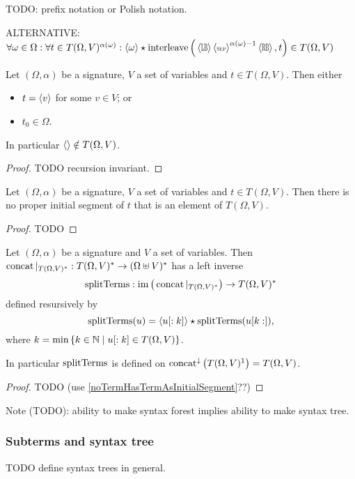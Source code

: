 TODO: prefix notation or Polish notation.

ALTERNATIVE: $\forall \omega\in\Omega: \forall t\in T(\Omega, V)^{\alpha(\omega)}: \seq{\omega}\concat \strInterleave\Big(\seq{\LB}\seq{\SEP}^{\alpha(\omega)-1}\seq{\RB}, t\Big) \in T(\Omega, V)$

\begin{lemma} \label{initialElementUATerm}
Let $(\Omega, \alpha)$ be a signature, $V$ a set of variables and $t\in T(\Omega, V)$. Then either
\begin{itemize}
\item $t = \left\langle v \right\rangle$ for some $v\in V$; or
\item $t_0\in \Omega$.
\end{itemize}
In particular $\left\langle  \right\rangle\notin T(\Omega, V)$.
\end{lemma}
\begin{proof}
TODO recursion invariant.
\end{proof}

\begin{lemma} \label{noTermHasTermAsInitialSegment}
Let $(\Omega, \alpha)$ be a signature, $V$ a set of variables and $t\in T(\Omega,V)$. Then there is no proper initial segment of $t$ that is an element of $T(\Omega, V)$.
\end{lemma}
\begin{proof}
TODO
\end{proof}

\begin{lemma}
Let $(\Omega, \alpha)$ be a signature and $V$ a set of variables. Then $\operatorname{concat}|_{T(\Omega, V)^*}: T(\Omega, V)^* \to (\Omega \uplus V)^*$ has a left inverse
\[ \operatorname{splitTerms}: \operatorname{im}\big(\operatorname{concat}|_{T(\Omega, V)^*}\big) \to T(\Omega, V)^* \]
defined resursively by
\[ \operatorname{splitTerms}(u) = \left\langle u[:k] \right\rangle \star \operatorname{splitTerms}(u[k:]), \]
where $k = \min\left\{ k\in\mathbb{N} \;\middle|\; u[:k]\in T(\Omega,V) \right\}$.
\end{lemma}
In particular $\operatorname{splitTerms}$ is defined on $\operatorname{concat}^\downarrow\big(T(\Omega, V)^1\big) = T(\Omega, V)$.
\begin{proof}
TODO (use \ref{noTermHasTermAsInitialSegment}??)
\end{proof}

Note (TODO): ability to make syntax forest implies ability to make syntax tree.

\subsubsection{Subterms and syntax tree}
TODO define syntax trees in general.

